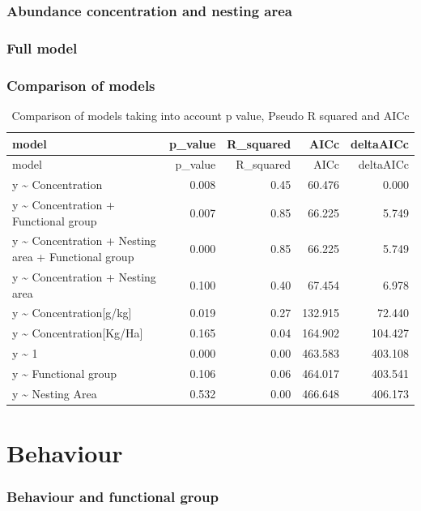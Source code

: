\documentclass[]{elsarticle} %
\begin{document}
\subsubsection{Abundance concentration and nesting
area}\label{abundance-concentration-and-nesting-area}

\subsubsection{Full model}\label{full-model}

\subsubsection{Comparison of models}\label{comparison-of-models}

\begin{longtable}[c]{@{}lrrrr@{}}
\caption{Comparison of models taking into account p value, Pseudo R
squared and AICc}\tabularnewline
\toprule
model & p\_value & R\_squared & AICc & deltaAICc\tabularnewline
\midrule
\endfirsthead
\toprule
model & p\_value & R\_squared & AICc & deltaAICc\tabularnewline
\midrule
\endhead
y \textasciitilde{} Concentration & 0.008 & 0.45 & 60.476 &
0.000\tabularnewline
y \textasciitilde{} Concentration + Functional group & 0.007 & 0.85 &
66.225 & 5.749\tabularnewline
y \textasciitilde{} Concentration + Nesting area + Functional group &
0.000 & 0.85 & 66.225 & 5.749\tabularnewline
y \textasciitilde{} Concentration + Nesting area & 0.100 & 0.40 & 67.454
& 6.978\tabularnewline
y \textasciitilde{} Concentration{[}g/kg{]} & 0.019 & 0.27 & 132.915 &
72.440\tabularnewline
y \textasciitilde{} Concentration{[}Kg/Ha{]} & 0.165 & 0.04 & 164.902 &
104.427\tabularnewline
y \textasciitilde{} 1 & 0.000 & 0.00 & 463.583 & 403.108\tabularnewline
y \textasciitilde{} Functional group & 0.106 & 0.06 & 464.017 &
403.541\tabularnewline
y \textasciitilde{} Nesting Area & 0.532 & 0.00 & 466.648 &
406.173\tabularnewline
\bottomrule
\end{longtable}

\section{Behaviour}\label{behaviour}

\subsubsection{Behaviour and functional
group}\label{behaviour-and-functional-group}
\end{document}
